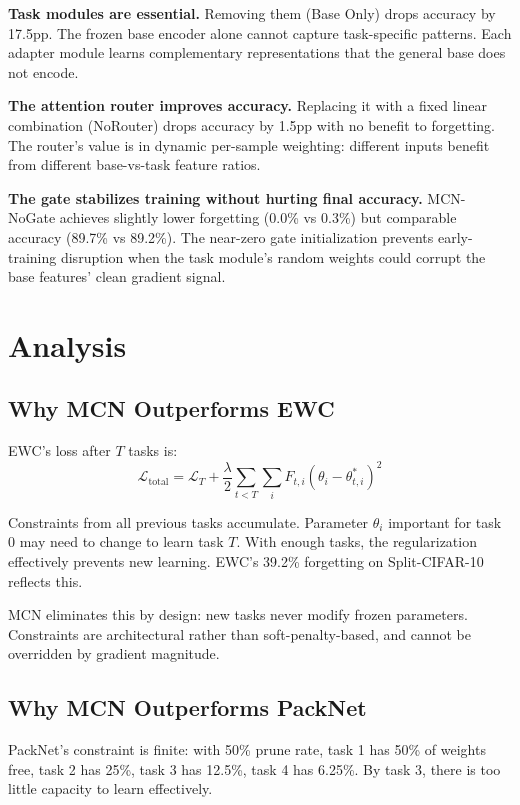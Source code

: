 \documentclass[10pt,twocolumn]{article}
\begin{document}
\textbf{Task modules are essential.} Removing them (Base Only) drops accuracy by 17.5pp. The frozen base encoder alone cannot capture task-specific patterns. Each adapter module learns complementary representations that the general base does not encode.

\textbf{The attention router improves accuracy.} Replacing it with a fixed linear combination (NoRouter) drops accuracy by 1.5pp with no benefit to forgetting. The router's value is in dynamic per-sample weighting: different inputs benefit from different base-vs-task feature ratios.

\textbf{The gate stabilizes training without hurting final accuracy.} MCN-NoGate achieves slightly lower forgetting (0.0\% vs 0.3\%) but comparable accuracy (89.7\% vs 89.2\%). The near-zero gate initialization prevents early-training disruption when the task module's random weights could corrupt the base features' clean gradient signal.

\section{Analysis}

\subsection{Why MCN Outperforms EWC}

EWC's loss after $T$ tasks is:
\[
\mathcal{L}_\text{total} = \mathcal{L}_T + \frac{\lambda}{2} \sum_{t < T} \sum_i F_{t,i} (\theta_i - \theta^*_{t,i})^2
\]

Constraints from all previous tasks accumulate. Parameter $\theta_i$ important for task 0 may need to change to learn task $T$. With enough tasks, the regularization effectively prevents new learning. EWC's 39.2\% forgetting on Split-CIFAR-10 reflects this.

MCN eliminates this by design: new tasks never modify frozen parameters. Constraints are architectural rather than soft-penalty-based, and cannot be overridden by gradient magnitude.

\subsection{Why MCN Outperforms PackNet}

PackNet's constraint is finite: with 50\% prune rate, task 1 has 50\% of weights free, task 2 has 25\%, task 3 has 12.5\%, task 4 has 6.25\%. By task 3, there is too little capacity to learn effectively.
\end{document}
